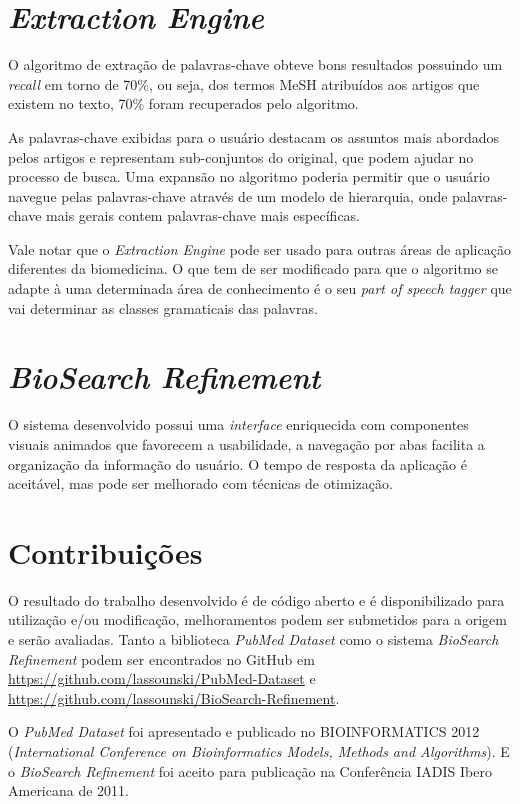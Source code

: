 \section{\emph{Extraction Engine}}

O algoritmo de extração de palavras-chave obteve bons resultados possuindo um \emph{recall} em torno de 70\%, ou seja, dos termos MeSH atribuídos aos artigos que existem no texto, 70\% foram recuperados pelo algoritmo.

As palavras-chave exibidas para o usuário destacam os assuntos mais abordados pelos artigos e representam sub-conjuntos do original, que podem ajudar no processo de busca. Uma expansão no algoritmo poderia permitir que o usuário navegue pelas palavras-chave através de um modelo de hierarquia, onde palavras-chave mais gerais contem palavras-chave mais específicas.

Vale notar que o \emph{Extraction Engine} pode ser usado para outras áreas de aplicação diferentes da biomedicina. O que tem de ser modificado para que o algoritmo se adapte à uma determinada área de conhecimento é o seu \emph{part of speech tagger} que vai determinar as classes gramaticais das palavras.

\section{\emph{BioSearch Refinement}}

O sistema desenvolvido possui uma \emph{interface} enriquecida com componentes visuais animados que favorecem a usabilidade, a navegação por abas facilita a organização da informação do usuário. O tempo de resposta da aplicação é aceitável, mas pode ser melhorado com técnicas de otimização.

\section{Contribuições}
O resultado do trabalho desenvolvido é de código aberto e é disponibilizado para utilização e/ou modificação, melhoramentos podem ser submetidos para a origem e serão avaliadas. Tanto a biblioteca \emph{PubMed Dataset} como o sistema \emph{BioSearch Refinement} podem ser encontrados no GitHub em \url{https://github.com/lassounski/PubMed-Dataset} e \url{https://github.com/lassounski/BioSearch-Refinement}.

O \emph{PubMed Dataset} foi apresentado e publicado no BIOINFORMATICS 2012 (\emph{International Conference on Bioinformatics Models, Methods and Algorithms}). E o \emph{BioSearch Refinement} foi aceito para publicação na Conferência IADIS Ibero Americana de 2011.

